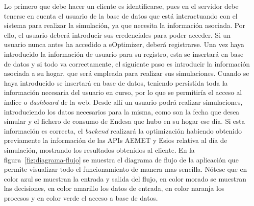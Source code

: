 Lo primero que debe hacer un cliente es identificarse, pues en el servidor debe tenerse en cuenta el usuario de la base de datos que está interactuando con el sistema para realizar la simulación, ya que necesita la información asociada. Por ello, el usuario deberá introducir sus credenciales para poder acceder. Si un usuario nunca antes ha accedido a eOptimizer, deberá registrarse. Una vez haya introducido la información de usuario para su registro, esta se insertará en base de datos y si todo va correctamente, el siguiente paso es introducir la información asociada a su hogar, que será empleada para realizar sus simulaciones. Cuando se haya introducido se insertará en base de datos, teniendo persistida toda la información necesaria del usuario en curso, por lo que se permitiría el acceso al índice o \textit{dashboard} de la web. Desde allí un usuario podrá realizar simulaciones, introduciendo los datos necesarios para la misma, como son la fecha que desea simular y el fichero de consumo de Endesa que hubo en su hogar ese día. Si esta información es correcta, el \textit{backend} realizará la optimización habiendo obtenido previamente la información de las APIs AEMET y Esios relativa al día de simulación, mostrando los resultados obtenidos al cliente. En la figura~\ref{fig:diagrama-flujo} se muestra el diagrama de flujo de la aplicación que permite visualizar todo el funcionamiento de manera mas sencilla. Nótese que en color azul se muestran la entrada y salida del flujo, en color morado se muestran las decisiones, en color amarillo los datos de entrada, en color naranja los procesos y en color verde el acceso a base de datos.\\
